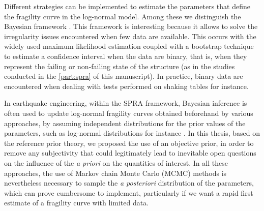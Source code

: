 Different strategies can be implemented to estimate the parameters that define the fragility curve in the log-normal model. Among these we distinguish the Bayesian framework
\citep{gardoni_probabilistic_2002,wang_seismic_2018,katayama_bayesian-estimation-based_2021,koutsourelakis_assessing_2010,damblin_approche_2014,tadinada_structural_2017,kwag_computationally_2018,jeon_parameterized_2019,tabandeh_physics-based_2020,lee_efficient_2023}. 
This framework is interesting because it allows to solve the irregularity issues encountered %
{when few data are available}. This occurs with the widely used maximum likelihood estimation coupled with a bootstrap technique to estimate a confidence interval when the data are binary, that is, when they represent the failing or non-failing state of the structure (as in the studies conducted in the \cref{part:spra} of this manuscript). In practice, binary data are encountered 
when dealing with tests performed on shaking tables for instance.

In earthquake engineering, within the SPRA framework, Bayesian inference is often used to update log-normal fragility curves obtained beforehand by various approaches, by assuming independent distributions for the prior values of the parameters, such as log-normal distributions for instance \citep{tadinada_structural_2017,kwag_computationally_2018,wang_seismic_2018,katayama_bayesian-estimation-based_2021,straub_improved_2008}. In this thesis, based on the reference prior theory, we proposed the use of an objective prior, in order to remove any subjectivity that could legitimately lead to inevitable open questions on the influence of the \emph{a priori} on the quantities of interest. In all these approaches, the use of Markov chain Monte Carlo (MCMC) methods is nevertheless necessary to sample the \emph{a posteriori} distribution of the parameters, which can prove cumbersome to implement, particularly if we want a rapid first estimate of a fragility curve with limited data. 


